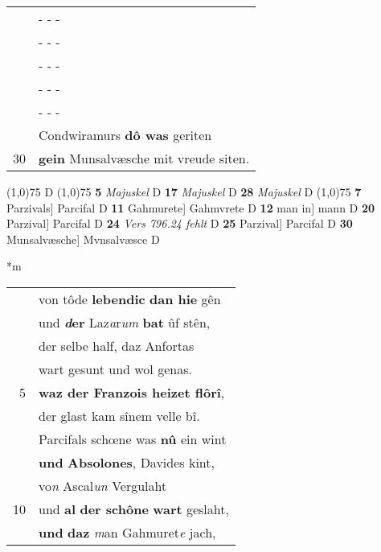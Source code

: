 \documentclass[8pt,a4paper,notitlepage]{article}
\begin{document}
\begin{table}[ht]
\begin{minipage}[t]{0.5\linewidth}
\begin{tabular}{rl}
 & \multicolumn{1}{l}{ - - - }\\ 
 & \multicolumn{1}{l}{ - - - }\\ 
 & \multicolumn{1}{l}{ - - - }\\ 
 & \multicolumn{1}{l}{ - - - }\\ 
 & \multicolumn{1}{l}{ - - - }\\ 
 & Condwiramurs \textbf{dô was} geriten\\ 
30 & \textbf{gein} Munsalvæsche mit vreude siten.\\ 
\end{tabular}
\scriptsize
\line(1,0){75} \newline
D \newline
\line(1,0){75} \newline
\textbf{5} \textit{Majuskel} D  \textbf{17} \textit{Majuskel} D  \textbf{28} \textit{Majuskel} D  \newline
\line(1,0){75} \newline
\textbf{7} Parzivals] Parcifal D \textbf{11} Gahmurete] Gahmvrete D \textbf{12} man in] mann D \textbf{20} Parzival] Parcifal D \textbf{24} \textit{Vers 796.24 fehlt} D  \textbf{25} Parzival] Parcifal D \textbf{30} Munsalvæsche] Mvnsalvæsce D \newline
\end{minipage}
\hspace{0.5cm}
\begin{minipage}[t]{0.5\linewidth}
\small
\begin{center}*m
\end{center}
\begin{tabular}{rl}
 & von tôde \textbf{lebendic} \textbf{dan hie} gên\\ 
 & und \textbf{\textit{d}er} Laz\textit{a}r\textit{um} \textbf{bat} ûf stên,\\ 
 & der selbe half, daz Anfortas\\ 
 & wart gesunt und wol genas.\\ 
5 & \textbf{waz der Franzois heizet flôrî},\\ 
 & der glast kam sînem velle bî.\\ 
 & Parcifals schœne was \textbf{nû} ein wint\\ 
 & \textbf{und} \textbf{Absolones}, Davides kint,\\ 
 & vo\textit{n} Ascal\textit{un} Vergulaht\\ 
10 & und \textbf{al} \textbf{der schône} \textbf{wart} geslaht,\\ 
 & \textbf{und} \textbf{daz} \textit{m}an Gahmuret\textit{e} jach,\\ 

\end{tabular}
\end{minipage}
\end{table}
\end{document}

